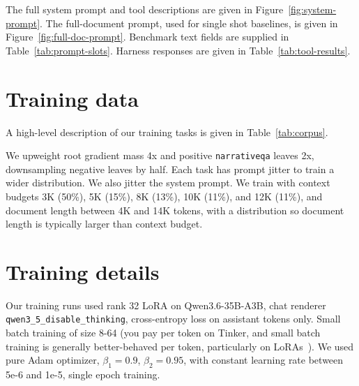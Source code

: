 \documentclass{article} %
\begin{document}
The full system prompt and tool descriptions are given in Figure~\ref{fig:system-prompt}. The full-document prompt, used for single shot baselines, is given in Figure~\ref{fig:full-doc-prompt}. Benchmark text fields are supplied in Table~\ref{tab:prompt-slots}. Harness responses are given in Table~\ref{tab:tool-results}.



\clearpage
\section{Training data}
\label{app:data}

A high-level description of our training tasks is given in Table~\ref{tab:corpus}. 



We upweight root gradient mass 4x and positive \texttt{narrativeqa} leaves 2x, downsampling negative leaves by half. Each task has prompt jitter to train a wider distribution. We also jitter the system prompt. We train with context budgets 3K (50\%), 5K (15\%), 8K (13\%), 10K (11\%), and 12K (11\%), and document length between 4K and 14K tokens, with a distribution so document length is typically larger than context budget.

\section{Training details}
\label{app:train}

Our training runs used rank 32 LoRA on Qwen3.6-35B-A3B, chat renderer \verb|qwen3_5_disable_thinking|, cross-entropy loss on assistant tokens only. Small batch training of size 8-64 (you pay per token on Tinker, and small batch training is generally better-behaved per token, particularly on LoRAs~\citep{marek2025smallbatch,schulman2025lora,masters2018small,keskar2017largebatch}). We used pure Adam optimizer, $\beta_1 = 0.9$, $\beta_2 = 0.95$, with constant learning rate between 5e-6 and 1e-5, single epoch training.
\end{document}
